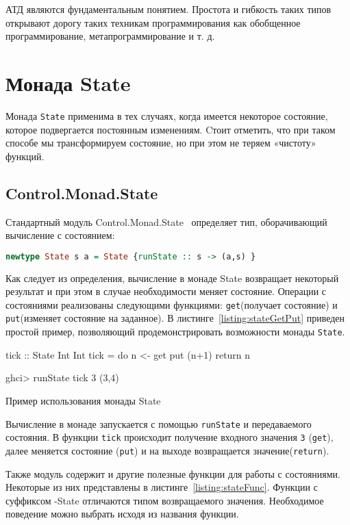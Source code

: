 АТД являются фундаментальным понятием. Простота и гибкость таких типов открывают дорогу таких техникам программирования как обобщенное программирование, метапрограммирование и т. д. 

\section{Монада State}

Монада \lstinline{State} применима в тех случаях, когда имеется некоторое состояние, которое подвергается постоянным изменениям. Cтоит отметить, что при таком способе мы трансформируем состояние, но при этом не теряем «чистоту» \: функций. 

\subsection{Control.Monad.State}

Стандартный модуль Control.Monad.State~\cite{stateControl} определяет тип, оборачивающий вычисление с состоянием:

\begin{lstlisting}[language=Haskell]
newtype State s a = State {runState :: s -> (a,s) }
\end{lstlisting} 
Как следует из определения, вычисление в монаде State возвращает некоторый результат и при этом в случае необходимости меняет состояние. Операции с состояниями реализованы следующими функциями: \lstinline{get}\:(получает состояние) и \lstinline{put}\:(изменяет состояние на заданное). В листинге~\ref{listing:stateGetPut} приведен простой пример, позволяющий продемонстрировать возможности монады \lstinline{State}.

\begin{ListingEnv}[H]
\begin{Verb}
tick :: State Int Int
tick = do n <- get
	  put (n+1)
          return n

ghci> runState tick 3
(3,4)
\end{Verb}
\caption{Пример использования монады State}
\label{listing:stateGetPut}
\end{ListingEnv}
Вычисление в монаде запускается с помощью \lstinline{runState} и передаваемого состояния. В функции \lstinline{tick} происходит получение входного значения \lstinline{3} (\lstinline{get}), далее меняется состояние (\lstinline{put}) и на выходе возвращается значение(\lstinline{return}).

Также модуль содержит и другие полезные функции для работы с состояниями. Некоторые из них представлены в листинге~\ref{listing:stateFunc}. Функции с суффиксом -State отличаются типом возвращаемого значения. Необходимое поведение можно выбрать исходя из названия функции.

